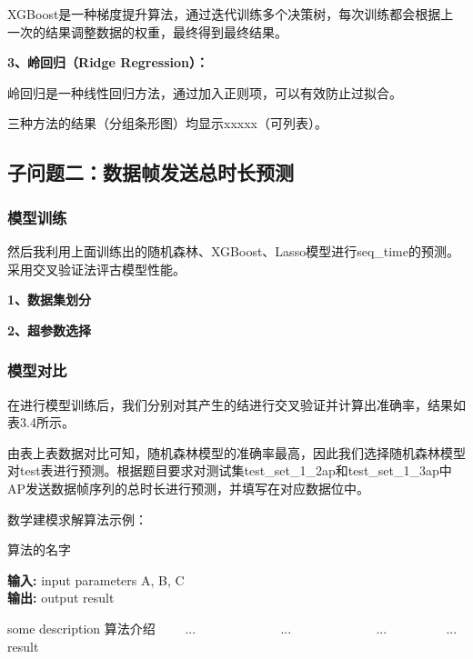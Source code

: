\documentclass[bwprint]{gmcmthesis}
\begin{document}
 XGBoost是一种梯度提升算法，通过迭代训练多个决策树，每次训练都会根据上一次的结果调整数据的权重，最终得到最终结果。
 
 \textbf{3、岭回归（Ridge Regression）：}
 
 岭回归是一种线性回归方法，通过加入正则项，可以有效防止过拟合。

 三种方法的结果（分组条形图）均显示{xxxxx}（可列表）。

 \subsection{子问题二：数据帧发送总时长预测}
 \subsubsection{模型训练}
 然后我利用上面训练出的随机森林、XGBoost、Lasso模型进行seq\_time的预测。采用交叉验证法评古模型性能。

 \textbf{1、数据集划分}

 \textbf{2、超参数选择}

 \subsubsection{模型对比}
 在进行模型训练后，我们分别对其产生的结进行交叉验证并计算出准确率，结果如表3.4所示。

 由表上表数据对比可知，随机森林模型的准确率最高，因此我们选择随机森林模型对test表进行预测。根据题目要求对测试集test\_set\_1\_2ap和test\_set\_1\_3ap中AP发送数据帧序列的总时长进行预测，并填写在对应数据位中。
 
 数学建模求解算法示例：
\begin{center}
\begin{minipage}{0.8\textwidth}
\begin{algorithm}[H]%
\caption{算法的名字} %
{\bf 输入:} %
input parameters A, B, C\\
{\bf 输出:} %
output result
\begin{algorithmic}[1]
\State some description 算法介绍 %
　　\State ...
　　　　\State ...
　　\Else
　　　　\State ...
　　\EndIf
\EndFor
{} %
　　\State ...
\EndWhile
\State \Return result
\end{algorithmic}
\end{algorithm}
\end{minipage}
\end{center}
\vspace{2ex}
\end{document}
